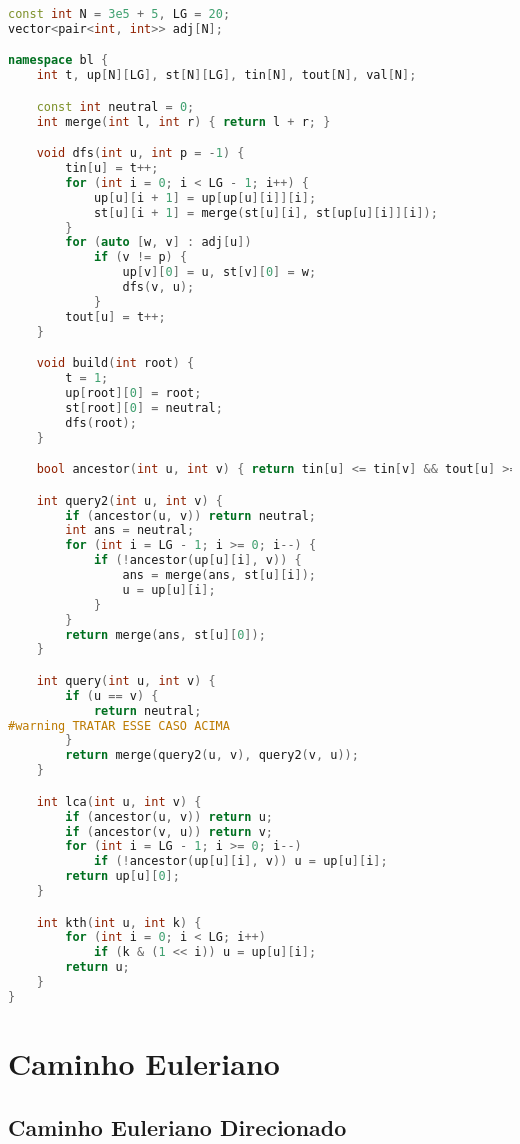 \documentclass[10pt, a4paper, oneside]{book}
\begin{document}
\begin{lstlisting}[language=C++]
const int N = 3e5 + 5, LG = 20;
vector<pair<int, int>> adj[N];

namespace bl {
    int t, up[N][LG], st[N][LG], tin[N], tout[N], val[N];

    const int neutral = 0;
    int merge(int l, int r) { return l + r; }

    void dfs(int u, int p = -1) {
        tin[u] = t++;
        for (int i = 0; i < LG - 1; i++) {
            up[u][i + 1] = up[up[u][i]][i];
            st[u][i + 1] = merge(st[u][i], st[up[u][i]][i]);
        }
        for (auto [w, v] : adj[u])
            if (v != p) {
                up[v][0] = u, st[v][0] = w;
                dfs(v, u);
            }
        tout[u] = t++;
    }

    void build(int root) {
        t = 1;
        up[root][0] = root;
        st[root][0] = neutral;
        dfs(root);
    }

    bool ancestor(int u, int v) { return tin[u] <= tin[v] && tout[u] >= tout[v]; }

    int query2(int u, int v) {
        if (ancestor(u, v)) return neutral;
        int ans = neutral;
        for (int i = LG - 1; i >= 0; i--) {
            if (!ancestor(up[u][i], v)) {
                ans = merge(ans, st[u][i]);
                u = up[u][i];
            }
        }
        return merge(ans, st[u][0]);
    }

    int query(int u, int v) {
        if (u == v) {
            return neutral;
#warning TRATAR ESSE CASO ACIMA
        }
        return merge(query2(u, v), query2(v, u));
    }

    int lca(int u, int v) {
        if (ancestor(u, v)) return u;
        if (ancestor(v, u)) return v;
        for (int i = LG - 1; i >= 0; i--)
            if (!ancestor(up[u][i], v)) u = up[u][i];
        return up[u][0];
    }

    int kth(int u, int k) {
        for (int i = 0; i < LG; i++)
            if (k & (1 << i)) u = up[u][i];
        return u;
    }
}
\end{lstlisting}
\hfill

\section{Caminho Euleriano}
\subsection{Caminho Euleriano Direcionado}
\end{document}
